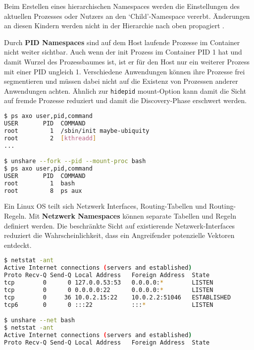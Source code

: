 Beim Erstellen eines hierarchischen Namespaces werden die Einstellungen des aktuellen Prozesses oder Nutzers an den `Child'-Namespace vererbt. Änderungen an diesen Kindern werden nicht in der Hierarchie nach oben propagiert \cite{man-ns-7}. 

Durch \textbf{PID Namespaces} sind auf dem Host laufende Prozesse im Container nicht weiter sichtbar. Auch wenn der init Prozess im Container PID 1 hat und damit Wurzel des Prozessbaumes ist, ist er für den Host nur ein weiterer Prozess mit einer PID ungleich 1. Verschiedene Anwendungen können ihre Prozesse frei segmentieren und müssen dabei nicht auf die Existenz von Prozessen anderer
Anwendungen achten. Ähnlich zur \texttt{hidepid} mount-Option kann damit die Sicht auf fremde Prozesse reduziert und damit die Discovery-Phase erschwert werden.

\begin{lstlisting}[language=sh,caption={Isolation von Prozessen über PID namespaces}]
$ ps axo user,pid,command
USER       PID  COMMAND
root         1  /sbin/init maybe-ubiquity
root         2  [kthreadd]
...

$ unshare --fork --pid --mount-proc bash
$ ps axo user,pid,command
USER       PID  COMMAND
root         1  bash
root         8  ps aux
\end{lstlisting}

Ein Linux OS teilt sich Netzwerk Interfaces, Routing-Tabellen und Routing-Regeln. Mit \textbf{Netzwerk Namespaces} können separate Tabellen und Regeln definiert werden. Die beschränkte Sicht auf existierende Netzwerk-Interfaces reduziert die Wahrscheinlichkeit, dass ein Angreifender potenzielle Vektoren entdeckt.

\begin{lstlisting}[language=sh,basicstyle=\footnotesize\ttfamily,caption={Isolation der aktiven Internetverbindungen durch einen Netzwerk Namespace}]
$ netstat -ant
Active Internet connections (servers and established)
Proto Recv-Q Send-Q Local Address   Foreign Address  State
tcp        0      0 127.0.0.53:53   0.0.0.0:*        LISTEN
tcp        0      0 0.0.0.0:22      0.0.0.0:*        LISTEN
tcp        0     36 10.0.2.15:22    10.0.2.2:51046   ESTABLISHED
tcp6       0      0 :::22           :::*             LISTEN

$ unshare --net bash
$ netstat -ant
Active Internet connections (servers and established)
Proto Recv-Q Send-Q Local Address   Foreign Address  State
\end{lstlisting}


